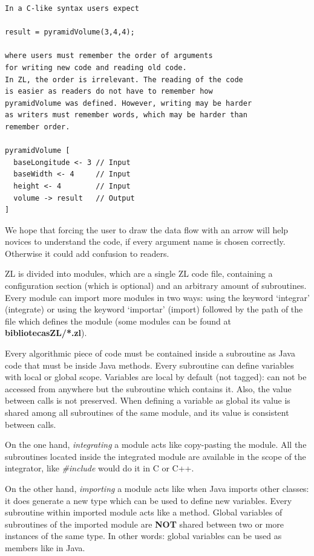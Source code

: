 \documentclass{report}
\begin{document}
	\vspace{10px}
	
\begin{BVerbatim}
In a C-like syntax users expect

result = pyramidVolume(3,4,4);

where users must remember the order of arguments 
for writing new code and reading old code.
In ZL, the order is irrelevant. The reading of the code 
is easier as readers do not have to remember how 
pyramidVolume was defined. However, writing may be harder 
as writers must remember words, which may be harder than 
remember order.

pyramidVolume [
  baseLongitude <- 3 // Input 
  baseWidth <- 4     // Input
  height <- 4        // Input
  volume -> result   // Output
]
\end{BVerbatim}

	\vspace{10px}

	We hope that forcing the user to draw the data flow with an arrow will help novices to understand the code, if every argument name is chosen correctly. Otherwise it could add confusion to readers.

	ZL is divided into modules, which are a single ZL code file, containing a configuration section (which is optional) and an arbitrary amount of subroutines. Every module can import more modules in two ways: using the keyword `integrar' (integrate) or using the keyword `importar' (import) followed by the path of the file which defines the module (some modules can be found at \textbf{bibliotecasZL/*.zl}).
	
	
	Every algorithmic piece of code must be contained inside a subroutine as Java code that must be inside Java methods. Every subroutine can define variables with local or global scope. Variables are local by default (not tagged): can not be accessed from anywhere but the subroutine which contains it. Also, the value between calls is not preserved. When defining a variable as global its value is shared among all subroutines of the same module, and its value is consistent between calls.  
	
	On the one hand, \textit{integrating} a module acts like copy-pasting the module. All the subroutines located inside the integrated module are available in the scope of the integrator, like \textit{\#include} would do it in C or C++.
	
	On the other hand, \textit{importing} a module acts like when Java imports other classes: it does generate a new type which can be used to define new variables. Every subroutine within imported module acts like a method. Global variables of subroutines of the imported module are \textbf{NOT} shared between two or more instances of the same type. In other words: global variables can be used as members like in Java. 
	
\end{document}
